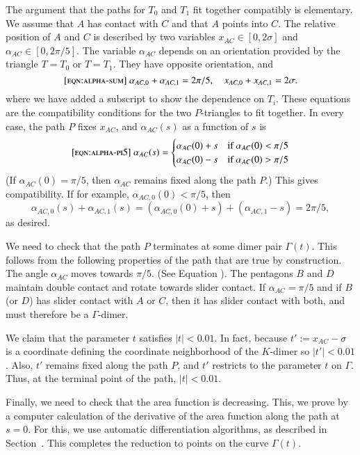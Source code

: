 The argument that the paths for $T_0$ and $T_1$ fit together compatibly is elementary.
We assume that $A$ has contact with $C$ and that $A$ points into $C$.
The relative position of $A$ and $C$ is described by two variables $x_{AC}\in[0,2\sigma]$ and 
$\alpha_{AC}\in[0,2\pi/5]$.
The variable $\alpha_{AC}$ depends on an orientation provided by the triangle $T=T_0$ or $T=T_1$.
They have opposite orientation, and 
\begin{equation}\libel{eqn:alpha-sum}
\alpha_{AC,0}+\alpha_{AC,1} = 2\pi/5,\quad x_{AC,0} + x_{AC,1} = 2\sigma.
\end{equation}
where we have added a subscript to show the dependence on $T_i$.  These equations are the
compatibility conditions for the two $P$-triangles to fit together.
In every case, the path $P$ fixes $x_{AC}$, and  $\alpha_{AC}(s)$ as a function of $s$ is
\begin{equation}\libel{eqn:alpha-pi5}
\alpha_{AC}(s) = 
\begin{cases}
\alpha_{AC}(0) + s&\text{if } \alpha_{AC}(0) < \pi/5\\
\alpha_{AC}(0) - s&\text{if } \alpha_{AC}(0) > \pi/5\\
\end{cases}
\end{equation}
(If $\alpha_{AC}(0) = \pi/5$, then $\alpha_{AC}$ remains fixed along the path $P$.)
This gives compatibility. If for example, $\alpha_{AC,0}(0) < \pi/5$, then
\[
\alpha_{AC,0}(s) + \alpha_{AC,1}(s) = (\alpha_{AC,0}(0) + s) + (\alpha_{AC,1} - s) = 2\pi/5,
\]
as desired.

We need to check that the path $P$ terminates at some dimer pair $\Gamma(t)$.  This follows from
the following properties of the path that are true by construction.  The angle $\alpha_{AC}$ moves
towards $\pi/5$. (See Equation ). The pentagons $B$ and $D$ maintain double contact
and rotate towards slider contact.   If $\alpha_{AC}=\pi/5$ and if $B$ (or $D$) has slider contact with $A$ or $C$,
then it has slider contact with both, and must therefore be a $\Gamma$-dimer.

We claim that the parameter $t$ satisfies $|t|<0.01$.  In fact, 
because $t' := x_{AC}-\sigma$ is a coordinate defining the
coordinate neighborhood of the $K$-dimer so $|t'|<0.01$.  Also, $t'$ remains fixed along the path $P$,
and $t'$ restricts to the parameter $t$ on $\Gamma$.  Thus, at the terminal point of the path, $|t|<0.01$.

Finally, we need to check that the area function is decreasing. This, we prove by a computer calculation
of the derivative of the area function along the path at $s=0$.  For this, we use automatic differentiation algorithms,
as described in Section~.  This completes the reduction to points on the curve $\Gamma(t)$.


